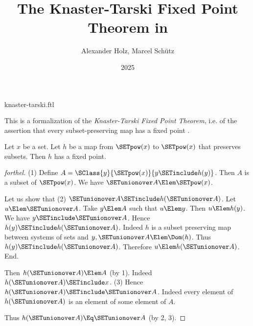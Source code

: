 \documentclass{stex}
\title{The Knaster-Tarski Fixed Point Theorem in \Naproche}
\author{Alexander Holz, Marcel Schütz}
\date{2025}
\begin{document}
\begin{smodule}{knaster-tarski.ftl}
\maketitle


\noindent This is a formalization of the \textit{Knaster-Tarski Fixed Point
Theorem}, i.e. of the assertion that every subset-preserving map has a fixed
point \cite{Schroeder2012}.

\begin{theorem}[forthel,title=Knaster-Tarski,id=knaster_tarski]
  Let $x$ be a set.
  Let $h$ be a map from $\SETpow(x)$ to $\SETpow(x)$ that preserves subsets.
  Then $h$ has a fixed point.
\end{theorem}
\begin{proof}[forthel]
  (1) Define $A = \SClass{y}{\SETpow(x)}{y \SETinclude h(y)}$.
  Then $A$ is a subset of $\SETpow(x)$.
  We have $\SETunionover A \Elem \SETpow(x)$.

  Let us show that (2) $\SETunionover A \SETinclude h(\SETunionover A)$.
    Let $u \Elem \SETunionover A$.
    Take $y \Elem A$ such that $u \Elem y$.
    Then $u \Elem h(y)$.
    We have $y \SETinclude \SETunionover A$.
    Hence $h(y) \SETinclude h(\SETunionover A)$.
    Indeed $h$ is a subset preserving map between systems of sets and $y, \SETunionover A \Elem \Dom(h)$.
    Thus $h(y) \SETinclude h(\SETunionover A)$.
    Therefore $u \Elem h(\SETunionover A)$.
  End.

  Then $h(\SETunionover A) \Elem A$ (by 1).
  Indeed $h(\SETunionover A) \SETinclude x$.
  (3) Hence $h(\SETunionover A) \SETinclude \SETunionover A$.
  Indeed every element of $h(\SETunionover A)$ is an element of some element of
  $A$.

  Thus $h(\SETunionover A) \Eq \SETunionover A$ (by 2, 3).
\end{proof}


\printbibliography
{}
\end{smodule}
\end{document}
